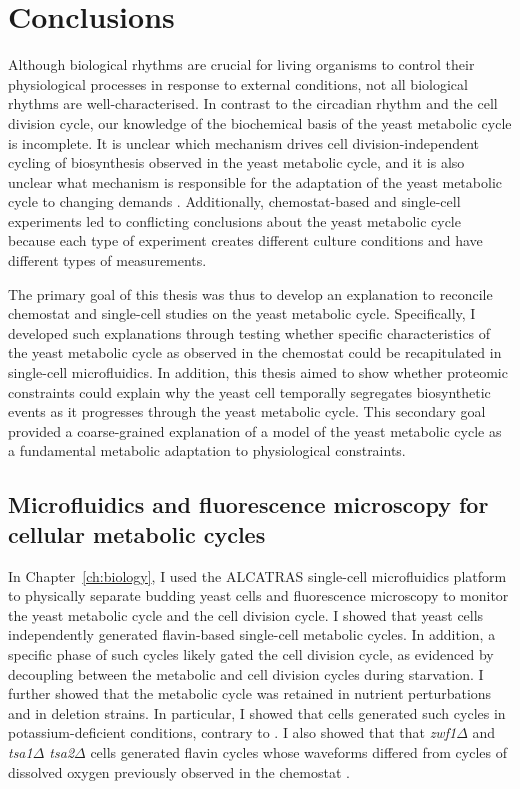 \chapter{Conclusions}
\label{ch:concl}

Although biological rhythms are crucial for living organisms to control their physiological processes in response to external conditions, not all biological rhythms are well-characterised.
In contrast to the circadian rhythm and the cell division cycle, our knowledge of the biochemical basis of the yeast metabolic cycle is incomplete.
It is unclear which mechanism drives cell division-independent cycling of biosynthesis observed in the yeast metabolic cycle, and it is also unclear what mechanism is responsible for the adaptation of the yeast metabolic cycle to changing demands \parencite{zylstraMetabolicDynamicsCell2022}.
Additionally, chemostat-based and single-cell experiments led to conflicting conclusions about the yeast metabolic cycle because each type of experiment creates different culture conditions and have different types of measurements.

The primary goal of this thesis was thus to develop an explanation to reconcile chemostat and single-cell studies on the yeast metabolic cycle.
Specifically, I developed such explanations through testing whether specific characteristics of the yeast metabolic cycle as observed in the chemostat could be recapitulated in single-cell microfluidics.
In addition, this thesis aimed to show whether proteomic constraints could explain why the yeast cell temporally segregates biosynthetic events as it progresses through the yeast metabolic cycle.
This secondary goal provided a coarse-grained explanation of a model of the yeast metabolic cycle as a fundamental metabolic adaptation to physiological constraints.


\section{Microfluidics and fluorescence microscopy for cellular metabolic cycles}
\label{sec:concl-biology}

In Chapter~\ref{ch:biology}, I used the ALCATRAS \parencite{craneMicrofluidicSystemStudying2014} single-cell microfluidics platform to physically separate budding yeast cells and fluorescence microscopy to monitor the yeast metabolic cycle and the cell division cycle.
I showed that yeast cells independently generated flavin-based single-cell metabolic cycles.
In addition, a specific phase of such cycles likely gated the cell division cycle, as evidenced by decoupling between the metabolic and cell division cycles during starvation.
I further showed that the metabolic cycle was retained in nutrient perturbations and in deletion strains.
In particular, I showed that cells generated such cycles in potassium-deficient conditions, contrary to \textcite{oneillEukaryoticCellBiology2020}.
I also showed that that \textit{zwf1$\Delta$} and \textit{tsa1$\Delta$ tsa2$\Delta$} cells generated flavin cycles whose waveforms differed from cycles of dissolved oxygen previously observed in the chemostat \parencite{tuCyclicChangesMetabolic2007,caustonMetabolicCyclesYeast2015}.


